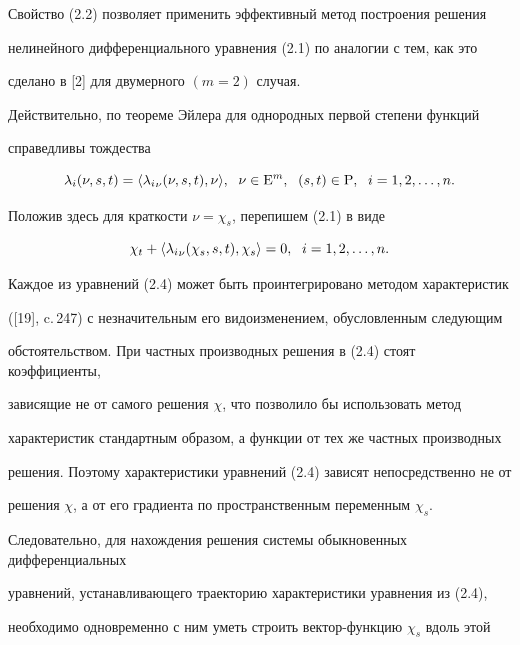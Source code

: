 Свойство (2.2) позволяет применить эффективный метод построения решения 


нелинейного дифференциального уравнения (2.1) по аналогии с тем, как это 


сделано в [2] для двумерного $(m=2)$ случая.





Действительно, по теореме Эйлера для однородных первой степени функций 


справедливы тождества


\begin{equation}


\lambda_i (\nu,s,t)=\la {\lambda_i}_{\nu} (\nu,s,t), \nu \ra, \ \;


\nu \in {\mathrm E}^m,\ \; (s,t) \in {\mathrm P},\ \; i=1,2,\dotsc,n.


\end{equation}


Положив здесь для краткости $\nu=\chi_s$, перепишем (2.1) в виде


\begin{equation}


\chi_t+\la {\lambda_i}_{\nu} (\chi_s,s,t), \chi_s\ra=0, \ \;


i=1,2,\dotsc,n.


\end{equation}


Каждое из уравнений (2.4) может быть проинтегрировано методом характеристик 


([19], c.\,247) с незначительным его видоизменением, обусловленным следующим 


обстоятельством. При частных производных решения в (2.4) стоят коэффициенты, 


зависящие не от самого решения $\chi$, что позволило бы использовать метод


характеристик стандартным образом, а функции от тех же частных производных


решения. Поэтому характеристики уравнений (2.4) зависят непосредственно не от


решения $\chi$, а от его градиента по пространственным переменным $\chi_s$.


Следовательно, для нахождения решения системы обыкновенных дифференциальных


уравнений, устанавливающего траекторию характеристики уравнения из (2.4),


необходимо одновременно с ним уметь строить вектор-функцию $\chi_s$ вдоль этой 


